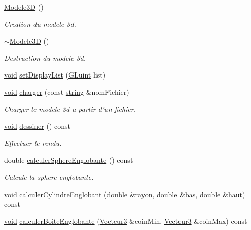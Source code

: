 \begin{DoxyCompactItemize}
\item 
\hyperlink{group__inf2990_ga61424b36eaf9f88c825890aa57192bfd}{Modele3\-D} ()
\begin{DoxyCompactList}\small\item\em Creation du modele 3d. \end{DoxyCompactList}\item 
\hyperlink{group__inf2990_ga28d3f261304927aa825e902c61555307}{$\sim$\-Modele3\-D} ()
\begin{DoxyCompactList}\small\item\em Destruction du modele 3d. \end{DoxyCompactList}\item 
\hyperlink{wglew_8h_aeea6e3dfae3acf232096f57d2d57f084}{void} \hyperlink{group__inf2990_ga2d4fe693acad70384447b9db282e3912}{set\-Display\-List} (\hyperlink{glew_8h_a68c4714e43d8e827d80759f9cb864f3c}{G\-Luint} list)
\item 
\hyperlink{wglew_8h_aeea6e3dfae3acf232096f57d2d57f084}{void} \hyperlink{group__inf2990_gae9a28411f50e679373dd41c62ffc9698}{charger} (const \hyperlink{glew_8h_ae84541b4f3d8e1ea24ec0f466a8c568b}{string} \&nom\-Fichier)
\begin{DoxyCompactList}\small\item\em Charger le modele 3d a partir d'un fichier. \end{DoxyCompactList}\item 
\hyperlink{wglew_8h_aeea6e3dfae3acf232096f57d2d57f084}{void} \hyperlink{group__inf2990_ga024588f2e5354c3753dd73278e7755e4}{dessiner} () const 
\begin{DoxyCompactList}\small\item\em Effectuer le rendu. \end{DoxyCompactList}\item 
double \hyperlink{group__inf2990_ga2f6cf63dd757e87478e5bf109431a1f5}{calculer\-Sphere\-Englobante} () const 
\begin{DoxyCompactList}\small\item\em Calcule la sphere englobante. \end{DoxyCompactList}\item 
\hyperlink{wglew_8h_aeea6e3dfae3acf232096f57d2d57f084}{void} \hyperlink{group__inf2990_ga64446e685fdef334ae85392340735fbc}{calculer\-Cylindre\-Englobant} (double \&rayon, double \&bas, double \&haut) const 
\item 
\hyperlink{wglew_8h_aeea6e3dfae3acf232096f57d2d57f084}{void} \hyperlink{group__inf2990_gac3a33e3e2675268653ae5846be055c21}{calculer\-Boite\-Englobante} (\hyperlink{group__utilitaire_ga541aa4837ad9250d3a248dc82ee9ad4d}{Vecteur3} \&coin\-Min, \hyperlink{group__utilitaire_ga541aa4837ad9250d3a248dc82ee9ad4d}{Vecteur3} \&coin\-Max) const 

\end{DoxyCompactItemize}
